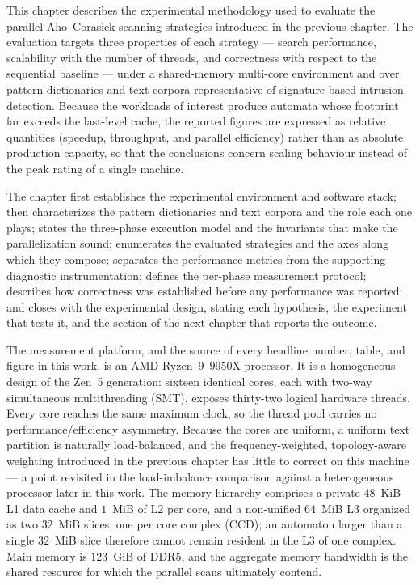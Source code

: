 This chapter describes the experimental methodology used to evaluate the
parallel Aho--Corasick scanning strategies introduced in the previous chapter.
The evaluation targets three properties of each strategy --- search
performance, scalability with the number of threads, and correctness with
respect to the sequential baseline --- under a shared-memory multi-core
environment and over pattern dictionaries and text corpora representative of
signature-based intrusion detection. Because the workloads of interest produce
automata whose footprint far exceeds the last-level cache, the reported figures
are expressed as relative quantities (speedup, throughput, and parallel
efficiency) rather than as absolute production capacity, so that the
conclusions concern scaling behaviour instead of the peak rating of a single
machine.

The chapter first establishes the experimental environment and software
stack; then characterizes the pattern dictionaries and text corpora and the
role each one plays; states the three-phase execution model and the invariants
that make the parallelization sound; enumerates the evaluated strategies and
the axes along which they compose; separates the performance metrics from the
supporting diagnostic instrumentation; defines the per-phase measurement
protocol; describes how correctness was established before any performance was
reported; and closes with the experimental design, stating each hypothesis, the
experiment that tests it, and the section of the next chapter that reports the
outcome.


The measurement platform, and the source of every headline number, table, and
figure in this work, is an AMD Ryzen~9~9950X processor. It is a homogeneous
design of the Zen~5 generation: sixteen identical cores, each with two-way
simultaneous multithreading (SMT), exposes thirty-two logical hardware threads.
Every core reaches the same maximum clock, so the thread pool carries no
performance/efficiency asymmetry. Because the cores are uniform, a uniform text
partition is naturally load-balanced, and the frequency-weighted, topology-aware
weighting introduced in the previous chapter has little to correct on this
machine --- a point revisited in the load-imbalance comparison against a
heterogeneous processor later in this work. The memory hierarchy comprises a
private $48$~KiB L1 data cache and $1$~MiB of L2 per core, and a non-unified
$64$~MiB L3 organized as two $32$~MiB slices, one per core complex (CCD); an
automaton larger than a single $32$~MiB slice therefore cannot remain resident in
the L3 of one complex. Main memory is $123$~GiB of DDR5, and the aggregate memory
bandwidth is the shared resource for which the parallel scans ultimately contend.

